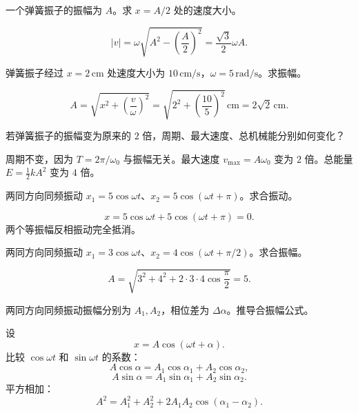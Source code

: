 \begin{exercise}[level=standard]
一个弹簧振子的振幅为 $A$。求 $x=A/2$ 处的速度大小。
\begin{solution}
\[
  |v|=\omega\sqrt{A^2-\left(\frac{A}{2}\right)^2}
  =\frac{\sqrt3}{2}\omega A.
\]
\end{solution}
\end{exercise}

\begin{exercise}[level=standard]
弹簧振子经过 $x=2\,\mathrm{cm}$ 处速度大小为 $10\,\mathrm{cm/s}$，$\omega=5\,\mathrm{rad/s}$。求振幅。
\begin{solution}
\[
  A=\sqrt{x^2+\left(\frac{v}{\omega}\right)^2}
  =\sqrt{2^2+\left(\frac{10}{5}\right)^2}\,\mathrm{cm}
  =2\sqrt2\,\mathrm{cm}.
\]
\end{solution}
\end{exercise}

\begin{exercise}[level=standard]
若弹簧振子的振幅变为原来的 $2$ 倍，周期、最大速度、总机械能分别如何变化？
\begin{solution}
周期不变，因为 $T=2\pi/\omega_0$ 与振幅无关。最大速度 $v_{\max}=A\omega_0$ 变为 $2$ 倍。总能量 $E=\frac12kA^2$ 变为 $4$ 倍。
\end{solution}
\end{exercise}

\begin{exercise}[level=standard]
两同方向同频振动 $x_1=5\cos\omega t$、$x_2=5\cos(\omega t+\pi)$。求合振动。
\begin{solution}
\[
  x=5\cos\omega t+5\cos(\omega t+\pi)=0.
\]
两个等振幅反相振动完全抵消。
\end{solution}
\end{exercise}

\begin{exercise}[level=standard]
两同方向同频振动 $x_1=3\cos\omega t$、$x_2=4\cos(\omega t+\pi/2)$。求合振幅。
\begin{solution}
\[
  A=\sqrt{3^2+4^2+2\cdot3\cdot4\cos\frac{\pi}{2}}=5.
\]
\end{solution}
\end{exercise}

\begin{exercise}[level=standard]
两同方向同频振动振幅分别为 $A_1,A_2$，相位差为 $\Delta\alpha$。推导合振幅公式。
\begin{solution}
设
\[
  x=A\cos(\omega t+\alpha).
\]
比较 $\cos\omega t$ 和 $\sin\omega t$ 的系数：
\[
  A\cos\alpha=A_1\cos\alpha_1+A_2\cos\alpha_2,
\]
\[
  A\sin\alpha=A_1\sin\alpha_1+A_2\sin\alpha_2.
\]
平方相加：
\[
  A^2=A_1^2+A_2^2+2A_1A_2\cos(\alpha_1-\alpha_2).
\]
\end{solution}
\end{exercise}

